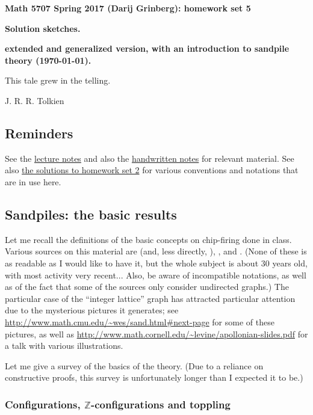 \documentclass[numbers=enddot,12pt,final,onecolumn,notitlepage]{scrartcl}%
\theoremstyle{definition}
\newcommand{\ZZ}{\mathbb{Z}}
\begin{document}
\begin{center}
\textbf{Math 5707 Spring 2017 (Darij Grinberg): homework set 5}

\textbf{Solution sketches.}

\textbf{extended and generalized version, with an introduction to sandpile theory (\today).}
\end{center}

\epigraph{This tale grew in the telling.}{J. R. R. Tolkien}

\tableofcontents

\subsection{Reminders}

See the
\href{http://www.cip.ifi.lmu.de/~grinberg/t/17s/nogra.pdf}{lecture notes}
and also the
\href{http://www.cip.ifi.lmu.de/~grinberg/t/17s/}{handwritten notes}
for relevant material.
See also
\href{http://www.cip.ifi.lmu.de/~grinberg/t/17s/hw2s.pdf}{the solutions to homework set 2}
\cite{hw2s}
for various conventions and notations that are in use here.

\subsection{Sandpiles: the basic results}

Let me recall the definitions of the basic concepts on chip-firing
done in class.
Various sources on this material are
\cite{BjoLov92} (and, less directly, \cite{BjLoSh91}),
\cite{HLMPPW13}, \cite[Lectures 29--31]{Musike09} and \cite{CorPet16}.
(None of these is as readable as I would like to have it, but the
whole subject is about 30 years old, with most activity very
recent...
Also, be aware of incompatible notations, as well as of the fact that
some of the sources only consider undirected graphs.)
The particular case of the ``integer lattice'' graph has attracted
particular attention due to the mysterious pictures it generates;
see \url{http://www.math.cmu.edu/~wes/sand.html#next-page} for some
of these pictures, as well as
\url{http://www.math.cornell.edu/~levine/apollonian-slides.pdf} for a
talk with various illustrations.

Let me give a survey of the basics of the theory.
(Due to a reliance on constructive proofs, this survey is
unfortunately longer than I expected it to be.)

\subsubsection{Configurations, $\ZZ$-configurations and toppling}
\end{document}
